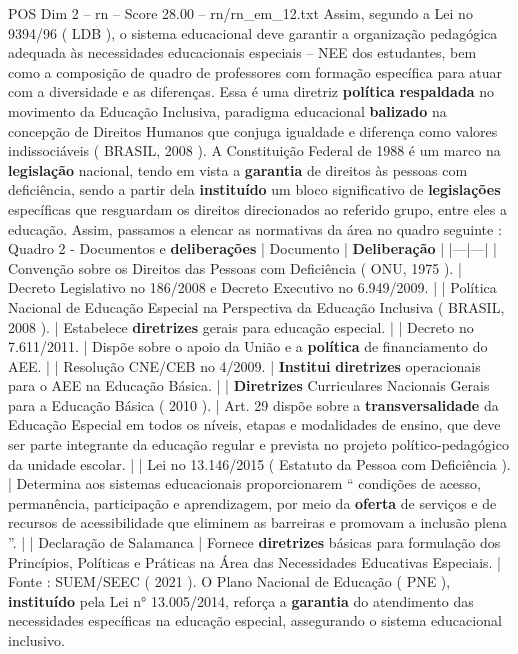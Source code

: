 \begin{textsample}{POS Dim 2 – rn – Score 28.00 – rn/rn\_em\_12.txt}
Assim, segundo a Lei no 9394/96 ( LDB ), o sistema educacional deve garantir a organização pedagógica adequada às necessidades educacionais especiais – NEE dos estudantes, bem como a composição de quadro de professores com formação específica para atuar com a diversidade e as diferenças.
Essa é uma diretriz \textbf{política} \textbf{respaldada} no movimento da Educação Inclusiva, paradigma educacional \textbf{balizado} na concepção de Direitos Humanos que conjuga igualdade e diferença como valores indissociáveis ( BRASIL, 2008 ).
A Constituição Federal de 1988 é um marco na \textbf{legislação} nacional, tendo em vista a \textbf{garantia} de direitos às pessoas com deficiência, sendo a partir dela \textbf{instituído} um bloco significativo de \textbf{legislações} específicas que resguardam os direitos direcionados ao referido grupo, entre eles a educação.
Assim, passamos a elencar as normativas da área no quadro seguinte : Quadro 2 - Documentos e \textbf{deliberações} | Documento | \textbf{Deliberação} | |---|---| | Convenção sobre os Direitos das Pessoas com Deficiência ( ONU, 1975 ). | Decreto Legislativo no 186/2008 e Decreto Executivo no 6.949/2009. | | Política Nacional de Educação Especial na Perspectiva da Educação Inclusiva ( BRASIL, 2008 ). | Estabelece \textbf{diretrizes} gerais para educação especial. | | Decreto no 7.611/2011. | Dispõe sobre o apoio da União e a \textbf{política} de financiamento do AEE. | | Resolução CNE/CEB no 4/2009. | \textbf{Institui} \textbf{diretrizes} operacionais para o AEE na Educação Básica. | | \textbf{Diretrizes} Curriculares Nacionais Gerais para a Educação Básica ( 2010 ). | Art. 29 dispõe sobre a \textbf{transversalidade} da Educação Especial em todos os níveis, etapas e modalidades de ensino, que deve ser parte integrante da educação regular e prevista no projeto político-pedagógico da unidade escolar. | | Lei no 13.146/2015 ( Estatuto da Pessoa com Deficiência ). | Determina aos sistemas educacionais proporcionarem “ condições de acesso, permanência, participação e aprendizagem, por meio da \textbf{oferta} de serviços e de recursos de acessibilidade que eliminem as barreiras e promovam a inclusão plena ”. | | Declaração de Salamanca | Fornece \textbf{diretrizes} básicas para formulação dos Princípios, Políticas e Práticas na Área das Necessidades Educativas Especiais. | Fonte : SUEM/SEEC ( 2021 ).
O Plano Nacional de Educação ( PNE ), \textbf{instituído} pela Lei n{\EmojiFont °} 13.005/2014, reforça a \textbf{garantia} do atendimento das necessidades específicas na educação especial, assegurando o sistema educacional inclusivo.

\end{textsample}
